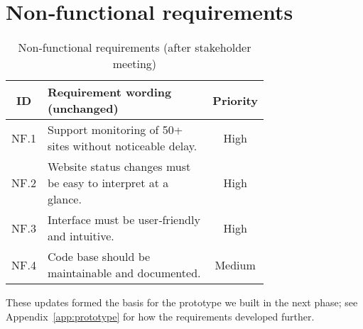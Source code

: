\section*{Non‑functional requirements}
\begin{table}[H]
\centering
\caption{Non‑functional requirements (after stakeholder meeting)}
\label{tab:appF-nonfunctional}
\begin{tabular}{|c|p{0.72\linewidth}|c|}
\hline
\textbf{ID} & \textbf{Requirement wording (unchanged)} & \textbf{Priority} \\ \hline
NF.1 & Support monitoring of 50+ sites without noticeable delay.& High \\ \hline
NF.2 & Website status changes must be easy to interpret at a glance. & High \\ \hline
NF.3 & Interface must be user‑friendly and intuitive. & High \\ \hline
NF.4 & Code base should be maintainable and documented. & Medium \\ \hline
\end{tabular}
\end{table}

\bigskip
\noindent
These updates formed the basis for the prototype we built in the next phase; see Appendix~\ref{app:prototype} for how the requirements developed further.

